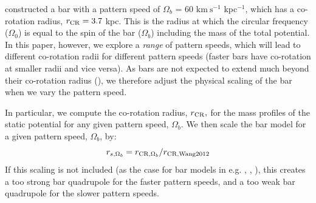 \documentclass[twocolumn]{aastex62}
\newcommand{\msun}{\textrm{M}_\odot}
\newcommand{\kms}{\ensuremath{\textrm{km}~\textrm{s}^{-1}}}
\newcommand{\todo}[1]{{\color{red} TODO: #1}}
\begin{document}
\citet{wang:2012} constructed a bar with a pattern speed of $\Omega_b$ =  60 $\kms$ kpc$^{-1}$, which has a co-rotation radius, $r_{\rm CR} = 3.7$ kpc.
This is the radius at which the circular frequency ($\Omega_0$) is equal to the spin of the bar ($\Omega_b$) including the mass of the total potential.
In this paper, however, we explore a {\it range} of pattern speeds, which will lead to different co-rotation radii for different pattern speeds (faster bars have co-rotation at smaller radii and vice versa).
As bars are not expected to extend much beyond their co-rotation radius (\citealt{binney:2008}), we therefore adjust the physical scaling of the bar when we vary the pattern speed. %

In particular, we  compute the co-rotation radius, $r_{\rm CR},$ for the mass profiles of the static potential for any given pattern speed, $\Omega_b$.
We then scale the bar model for a given pattern speed, $\Omega_b$, by:
\begin{equation}
r_{s, \Omega_b}  = r_{{\rm CR}, \Omega_b}/r_{{\rm CR, Wang 2012}}
\end{equation}
If this scaling is not included (as the case for bar models in e.g. %
\citealt{Pearson:2017}, \citealt{Erkal:2017}, \citealt{Banik:2019}), this creates a too strong bar quadrupole for the faster pattern speeds, and a too weak bar quadrupole for the slower pattern speeds.

%
\end{document}
